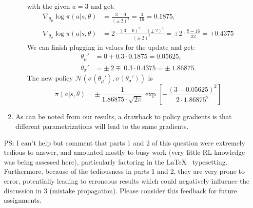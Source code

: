 \documentclass{article}
\begin{document}
\begin{enumerate}
\begin{enumerate}
		            with the given $a=3$ and get:
		            \begin{align*}
			            \nabla_{\theta_\mu} \log \pi(a|s, \theta)    & = \frac{3-0}{(\pm~2)^4}
			            = \frac{3}{16} = 0.1875,                                               \\
			            \nabla_{\theta_\sigma} \log \pi(a|s, \theta) & = 2 \cdot \frac{
				            (3-0)^2-(\pm~2)^4 }{(\pm ~2)^5} = \pm 2 \cdot \frac{9 - 16}{32} = \mp 0.4375
		            \end{align*}
		            We can finish plugging in values for the update and get:
		            \begin{align}
			            \theta_\mu'    & =  0 + 0.3 \cdot 0.1875 = 0.05625,               \\
			            \theta_\sigma' & =  \pm~ 2 \mp~ 0.3 \cdot 0.4375 = \pm~ 1.86875.
		            \end{align}
		            The new policy $\mathcal{N}(\sigma(\theta_\mu'), \sigma(\theta_\sigma'))$ is
		            \begin{equation}
			            \pi(a|s, \theta) = \pm~ \frac{1}{1.86875 \cdot \sqrt{2 \pi}}\exp\left[-\frac{(3
					            - 0.05625)^2}{2 \cdot 1.86875^2}\right]
		            \end{equation}
	      \end{enumerate}
	\item As can be noted from our results, a drawback to policy gradients is that different
	      parametrizations will lead to the same gradients.
\end{enumerate}

PS: I can't help but comment that parts 1 and 2 of this question were extremely tedious to answer,
and amounted mostly to busy work (very little RL knowledge was being assessed here), particularly
factoring in the \LaTeX~ typesetting. Furthermore, because of the tediousness in parts 1 and 2, they
are very prone to error, potentially leading to erroneous results which could negatively influence
the discussion in 3 (mistake propagation). Please consider this feedback for future assignments.
\end{document}
